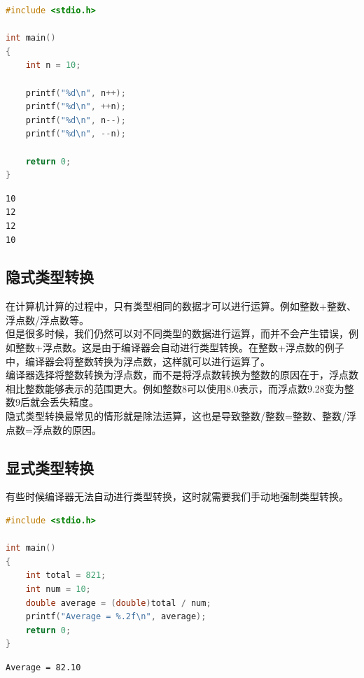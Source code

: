 \begin{lstlisting}[language=C]
#include <stdio.h>

int main()
{
	int n = 10;

	printf("%d\n", n++);
	printf("%d\n", ++n);
	printf("%d\n", n--);
	printf("%d\n", --n);

	return 0;
}
\end{lstlisting}

\begin{tcolorbox}
	\begin{verbatim}
10
12
12
10
	\end{verbatim}
\end{tcolorbox}

\vspace{0.5cm}

\subsection{隐式类型转换}

在计算机计算的过程中，只有类型相同的数据才可以进行运算。例如整数+整数、浮点数/浮点数等。\\

但是很多时候，我们仍然可以对不同类型的数据进行运算，而并不会产生错误，例如整数+浮点数。这是由于编译器会自动进行类型转换。在整数+浮点数的例子中，编译器会将整数转换为浮点数，这样就可以进行运算了。\\

编译器选择将整数转换为浮点数，而不是将浮点数转换为整数的原因在于，浮点数相比整数能够表示的范围更大。例如整数8可以使用8.0表示，而浮点数9.28变为整数9后就会丢失精度。\\

隐式类型转换最常见的情形就是除法运算，这也是导致整数/整数=整数、整数/浮点数=浮点数的原因。\\

\subsection{显式类型转换}

有些时候编译器无法自动进行类型转换，这时就需要我们手动地强制类型转换。\\


\begin{lstlisting}[language=C]
#include <stdio.h>

int main()
{
	int total = 821;
	int num = 10;
	double average = (double)total / num;
	printf("Average = %.2f\n", average);
	return 0;
}
\end{lstlisting}

\begin{tcolorbox}
	\begin{verbatim}
Average = 82.10
	\end{verbatim}
\end{tcolorbox}

\newpage